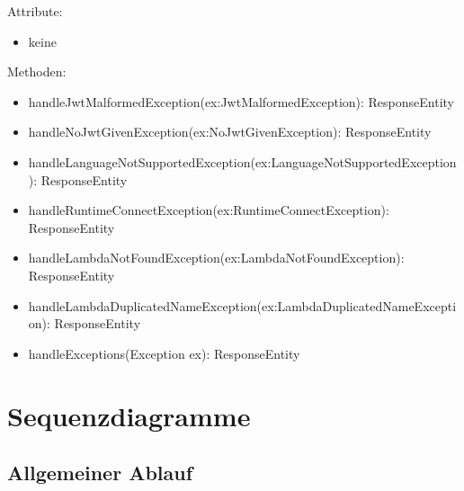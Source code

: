 \documentclass[a4paper,20pt,oneside]{book}
\begin{document}
	\vspace{0.5cm}
	Attribute:
	\begin{itemize}
	\item keine
	
	\end{itemize}
	
	Methoden:
	\begin{itemize}
	\item  handleJwtMalformedException(ex:JwtMalformedException): ResponseEntity\linebreak
	
	\item handleNoJwtGivenException(ex:NoJwtGivenException): ResponseEntity \linebreak
	
	\item handleLanguageNotSupportedException(ex:LanguageNotSupportedException): ResponseEntity\linebreak
	\item handleRuntimeConnectException(ex:RuntimeConnectException): ResponseEntity\linebreak
	\item handleLambdaNotFoundException(ex:LambdaNotFoundException): ResponseEntity\linebreak
	\item handleLambdaDuplicatedNameException(ex:LambdaDuplicatedNameException): ResponseEntity\linebreak
	\item handleExceptions(Exception ex): ResponseEntity\linebreak
	\end{itemize}

	\newpage	
	
	\chapter{Sequenzdiagramme}
	\section{Allgemeiner Ablauf}
\end{document}

